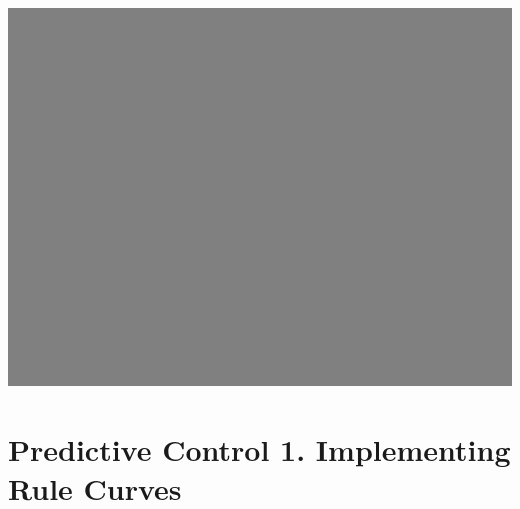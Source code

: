 \documentclass[compress,english]{beamer}
\begin{document}
{\usebackgroundtemplate%
	{\includegraphics[height=\paperheight]{background_grey.png}}
\section{Predictive Control 1. Implementing Rule Curves}
}
\end{document}
